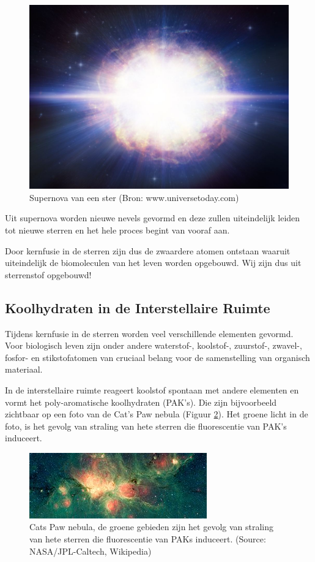\documentclass[
  11pt,
]{book}
\begin{document}
\begin{figure}

{\centering \includegraphics[width=0.5\linewidth]{./figs/hires} 

}

\caption{Supernova van een ster (Bron:  www.universetoday.com)}\label{fig:supernova}
\end{figure}

Uit supernova worden nieuwe nevels gevormd en deze zullen uiteindelijk leiden tot nieuwe sterren en het hele proces begint van vooraf aan.

Door kernfusie in de sterren zijn dus de zwaardere atomen ontstaan waaruit uiteindelijk de biomoleculen van het leven worden opgebouwd. Wij zijn dus uit sterrenstof opgebouwd!

\newpage

\hypertarget{koolhydraten-in-de-interstellaire-ruimte}{%
\subsection{Koolhydraten in de Interstellaire Ruimte}\label{koolhydraten-in-de-interstellaire-ruimte}}

Tijdens kernfusie in de sterren worden veel verschillende elementen gevormd. Voor biologisch leven zijn onder andere waterstof-, koolstof-, zuurstof-, zwavel-, fosfor- en stikstofatomen van cruciaal belang voor de samenstelling van organisch materiaal.

In de interstellaire ruimte reageert koolstof spontaan met andere elementen en vormt het poly-aromatische koolhydraten (PAK's). Die zijn bijvoorbeeld zichtbaar op een foto van de Cat's Paw nebula (Figuur \ref{fig:catPawNebula}). Het groene licht in de foto, is het gevolg van straling van hete sterren die fluorescentie van PAK's induceert.

\begin{figure}

{\centering \includegraphics[width=0.5\linewidth]{./figs/orionWithPAH} 

}

\caption{Cats Paw nebula, de groene gebieden zijn het gevolg van straling van hete sterren die fluorescentie van PAKs induceert. (Source: NASA/JPL-Caltech, Wikipedia)}\label{fig:catPawNebula}
\end{figure}
\end{document}
